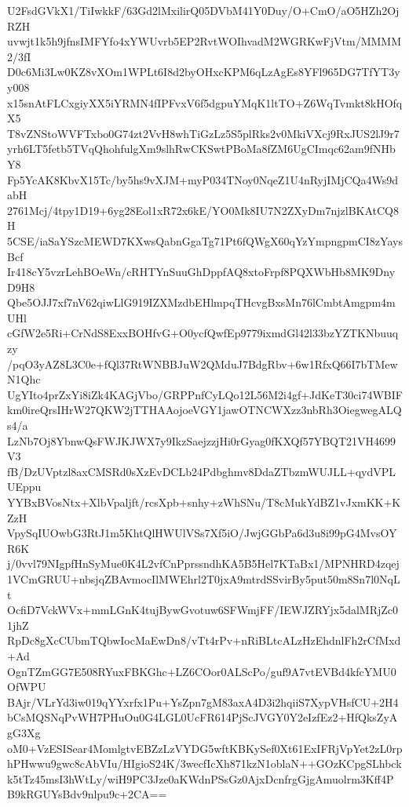 U2FsdGVkX1/TiIwkkF/63Gd2lMxilirQ05DVbM41Y0Duy/O+CmO/aO5HZh2OjRZH
uvwjt1k5h9jfnsIMFYfo4xYWUvrb5EP2RvtWOIhvadM2WGRKwFjVtm/MMMM2/3fI
D0c6Mi3Lw0KZ8vXOm1WPLt6I8d2byOHxcKPM6qLzAgEs8YFl965DG7TfYT3yy008
x15snAtFLCxgiyXX5iYRMN4fIPFvxV6f5dgpuYMqK1ltTO+Z6WqTvmkt8kHOfqX5
T8vZNStoWVFTxbo0G74zt2VvH8whTiGzLz5S5plRks2v0MkiVXcj9RxJUS2lJ9r7
yrh6LT5fetb5TVqQhohfulgXm9slhRwCKSwtPBoMa8fZM6UgCImqc62am9fNHbY8
Fp5YcAK8KbvX15Tc/by5hs9vXJM+myP034TNoy0NqeZ1U4nRyjIMjCQa4Ws9dabH
2761Mcj/4tpy1D19+6yg28Eol1xR72x6kE/YO0Mk8IU7N2ZXyDm7njzlBKAtCQ8H
5CSE/iaSaYSzcMEWD7KXwsQabnGgaTg71Pt6fQWgX60qYzYmpngpmCI8zYaysBcf
Ir418cY5vzrLehBOeWn/cRHTYnSuuGhDppfAQ8xtoFrpf8PQXWbHb8MK9DnyD9H8
Qbe5OJJ7xf7nV62qiwLlG919IZXMzdbEHlmpqTHcvgBxsMn76lCmbtAmgpm4mUHl
cGfW2e5Ri+CrNdS8ExxBOHfvG+O0ycfQwfEp9779ixmdGl42l33bzYZTKNbuuqzy
/pqO3yAZ8L3C0e+fQl37RtWNBBJuW2QMduJ7BdgRbv+6w1RfxQ66I7bTMewN1Qhc
UgYIto4prZxYi8iZk4KAGjVbo/GRPPnfCyLQo12L56M2i4gf+JdKeT30ci74WBIF
km0ireQrsIHrW27QKW2jTTHAAojoeVGY1jawOTNCWXzz3nbRh3OiegwegALQs4/a
LzNb7Oj8YbnwQsFWJKJWX7y9IkzSaejzzjHi0rGyag0fKXQf57YBQT21VH4699V3
fB/DzUVptzl8axCMSRd0sXzEvDCLb24Pdbghmv8DdaZTbzmWUJLL+qydVPLUEppu
YYBxBVosNtx+XlbVpaljft/rcsXpb+snhy+zWhSNu/T8cMukYdBZ1vJxmKK+KZzH
VpySqIUOwbG3RtJ1m5KhtQlHWUlVSs7Xf5iO/JwjGGbPa6d3u8i99pG4MvsOYR6K
j/0vvl79NIgpfHnSyMue0K4L2vfCnPprssndhKA5B5Hel7KTaBx1/MPNHRD4zqej
1VCmGRUU+nbsjqZBAvmocIlMWEhrl2T0jxA9mtrdSSvirBy5put50m8Sn7l0NqLt
OcfiD7VckWVx+mmLGnK4tujBywGvotuw6SFWmjFF/IEWJZRYjx5dalMRjZc01jhZ
RpDc8gXcCUbmTQbwIocMaEwDn8/vTt4rPv+nRiBLtcALzHzEhdnlFh2rCfMxd+Ad
OgnTZmGG7E508RYuxFBKGhc+LZ6COor0ALScPo/guf9A7vtEVBd4kfcYMU0OfWPU
BAjr/VLrYd3iw019qYYxrfx1Pu+YsZpn7gM83axA4D3i2hqiiS7XypVHsfCU+2H4
bCsMQSNqPvWH7PHuOu0G4LGL0UcFR614PjScJVGY0Y2eIzfEz2+HfQksZyAgG3Xg
oM0+VzESISear4MomlgtvEBZzLzVYDG5wftKBKySef0Xt61ExIFRjVpYet2zL0rp
hPHwwu9gwc8cAbVIu/HIgioS24K/3wecfIcXh871kzN1oblaN++GOzKCpgSLhbck
k5tTz45msI3hWtLy/wiH9PC3Jze0aKWdnPSsGz0AjxDcnfrgGjgAmuolrm3Kff4P
B9kRGUYsBdv9nlpu9c+2CA==
